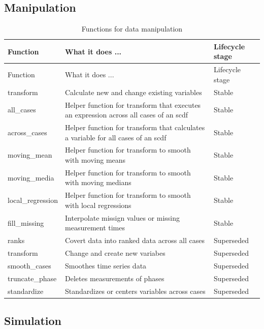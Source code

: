 \documentclass[
  letterpaper,
  DIV=11,
  numbers=noendperiod]{scrreprt}
\begin{document}
\hypertarget{manipulation}{%
\subsection{Manipulation}\label{manipulation}}

\hypertarget{tbl-functions-manipulation}{}
\begin{longtable}[]{@{}lll@{}}
\caption{\label{tbl-functions-manipulation}Functions for data
manipulation}\tabularnewline
\toprule()
Function & What it does ... & Lifecycle stage \\
\midrule()
\endfirsthead
\toprule()
Function & What it does ... & Lifecycle stage \\
\midrule()
\endhead
transform & Calculate new and change existing variables & Stable \\
all\_cases & Helper function for transform that executes an expression
across all cases of an scdf & Stable \\
across\_cases & Helper function for transform that calculates a variable
for all cases of an scdf & Stable \\
moving\_mean & Helper function for transform to smooth with moving means
& Stable \\
moving\_media & Helper function for transform to smooth with moving
medians & Stable \\
local\_regression & Helper function for transform to smooth with local
regressions & Stable \\
fill\_missing & Interpolate missign values or missing measurement times
& Stable \\
ranks & Covert data into ranked data across all cases & Superseded \\
transform & Change and create new variabes & Superseded \\
smooth\_cases & Smoothes time series data & Superseded \\
truncate\_phase & Deletes measurements of phases & Superseded \\
standardize & Standardizes or centers variables across cases &
Superseded \\
\bottomrule()
\end{longtable}

\hypertarget{simulation}{%
\subsection{Simulation}\label{simulation}}
\end{document}
